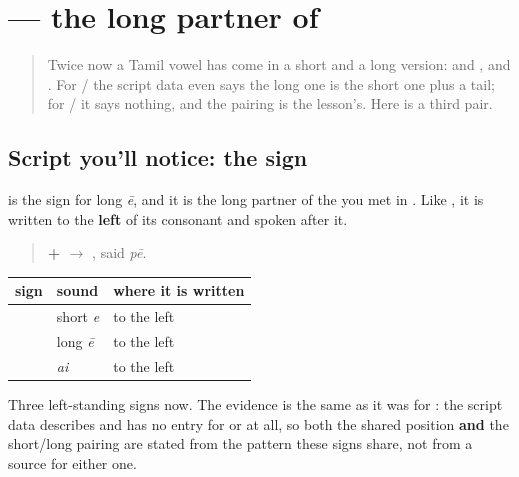 \section[\texorpdfstring{\ta{பேசு} (pēsu)}{பேசு (pēsu)}]{ — the long partner of }

\label{lesson:TA-W14-read-pesu}



\begin{quote}
Twice now a Tamil vowel has come in a short and a long version: \textbf{} and \textbf{}, \textbf{} and \textbf{}. For \textbf{}/\textbf{} the script data even says the long one is the short one plus a tail; for \textbf{}/\textbf{} it says nothing, and the pairing is the lesson's. Here is a third pair.
\end{quote}

\subsection*{Script you'll notice: the  sign}
\textbf{} is the sign for long \emph{ē}, and it is the long partner of the \textbf{} you met in \textbf{}. Like \textbf{}, it is written to the \textbf{left} of its consonant and spoken after it.

\begin{quote}
\textbf{ +  $\to$ }, said \emph{pē}.
\end{quote}

\noindent
\begin{tabularx}{\linewidth}{@{}>{\raggedright\arraybackslash}X>{\raggedright\arraybackslash}X>{\raggedright\arraybackslash}X@{}}
\toprule
\textbf{sign} & \textbf{sound} & \textbf{where it is written} \\
\midrule
\textbf{\ta{ெ}} & short \emph{e} & to the left \\
\textbf{\ta{ே}} & long \emph{ē} & to the left \\
\textbf{\ta{ை}} & \emph{ai} & to the left \\
\bottomrule
\end{tabularx}

Three left-standing signs now. The evidence is the same as it was for \textbf{}: the script data describes \textbf{} and has no entry for \textbf{} or \textbf{} at all, so both the shared position \textbf{and} the short/long pairing are stated from the pattern these signs share, not from a source for either one.

